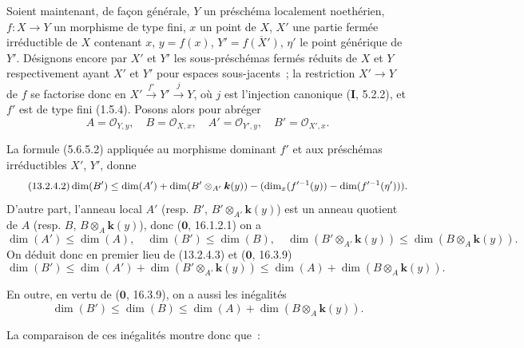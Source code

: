 \begin{env}[13.2.4]
\label{IV.13.2.4-fr}
Soient maintenant, de façon générale, $Y$ un préschéma localement noethérien,
$f:X\to Y$ un morphisme de type fini, $x$ un point de $X$, $X'$ une partie
fermée irréductible de $X$ contenant $x$, $y=f(x)$,
$Y'=\overline{f(X')}$, $\eta'$ le point générique de $Y'$. Désignons encore
par $X'$ et $Y'$ les sous-préschémas fermés réduits de $X$ et $Y$
respectivement ayant $X'$ et $Y'$ pour espaces sous-jacents~; la restriction
$X'\to Y$ de $f$ se factorise donc en
$X'\xrightarrow{f'}Y'\xrightarrow{j}Y$, où $j$ est l'injection canonique
(\textbf{I}, 5.2.2), et $f'$ est de type fini (1.5.4). Posons alors pour
abréger
\[
\tag{13.2.4.1}
\label{IV.13.2.4.1-fr}
  A=\mathcal O_{Y,y},\quad B=\mathcal O_{X,x},\quad
  A'=\mathcal O_{Y',y},\quad B'=\mathcal O_{X',x}.
\]

La formule (5.6.5.2) appliquée au morphisme dominant $f'$ et aux préschémas
irréductibles $X'$, $Y'$, donne
\[
\tag{13.2.4.2}
\label{IV.13.2.4.2-fr}
  \dim(B')\leq\dim(A')+\dim(B'\otimes_{A'}\boldsymbol{k}(y))
  -(\dim_x(f'^{-1}(y))-\dim(f'^{-1}(\eta'))).
\]
D'autre part, l'anneau local $A'$ (resp. $B'$, $B'\otimes_{A'}\boldsymbol{k}(y)$) est un
anneau quotient de $A$ (resp. $B$, $B\otimes_A\boldsymbol{k}(y)$), donc
($\mathbf 0$, 16.1.2.1) on a
\[
\tag{13.2.4.3}
\label{IV.13.2.4.3-fr}
  \dim(A')\leq\dim(A),\quad \dim(B')\leq\dim(B),\quad
  \dim(B'\otimes_{A'}\boldsymbol{k}(y))\leq\dim(B\otimes_A\boldsymbol{k}(y)).
\]
On déduit donc en premier lieu de (13.2.4.3) et ($\mathbf 0$, 16.3.9)
\[
\tag{13.2.4.4}
\label{IV.13.2.4.4-fr}
  \dim(B')\leq\dim(A')+\dim(B'\otimes_{A'}\boldsymbol{k}(y))
  \leq\dim(A)+\dim(B\otimes_A\boldsymbol{k}(y)).
\]

En outre, en vertu de ($\mathbf 0$, 16.3.9), on a aussi les inégalités
\[
\tag{13.2.4.5}
\label{IV.13.2.4.5-fr}
  \dim(B')\leq\dim(B)\leq\dim(A)+\dim(B\otimes_A\boldsymbol{k}(y)).
\]
\end{env}

La comparaison de ces inégalités montre donc que~:

